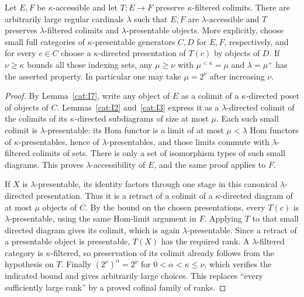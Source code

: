 \begin{theorem}\label{cat:I8}
Let $E,F$ be $\kappa$-accessible and let $T:E\to F$ preserve
$\kappa$-filtered colimits.  There are arbitrarily large regular
cardinals $\lambda$ such that $E,F$ are $\lambda$-accessible and
$T$ preserves $\lambda$-filtered colimits and
$\lambda$-presentable objects.
More explicitly, choose small full categories of $\kappa$-presentable
generators $C,D$ for $E,F$, respectively, and for every $c\in C$
choose a $\kappa$-directed presentation of $T(c)$ by objects of $D$.
If $\nu\geq\kappa$ bounds all those indexing sets, any
$\mu\geq\nu$ with $\mu^{<\kappa}=\mu$ and
$\lambda=\mu^+$ has the asserted property.
In particular one may take $\mu=2^\nu$ after increasing $\nu$.
\end{theorem}
\begin{proof}
By Lemma~\ref{cat:I7}, write any object of $E$ as a colimit of a
$\kappa$-directed poset of objects of $C$.
Lemmas~\ref{cat:I2} and~\ref{cat:I3} express it as a
$\lambda$-directed colimit of the colimits of its
$\kappa$-directed subdiagrams of size at most $\mu$.
Each such small colimit is $\lambda$-presentable: its Hom functor
is a limit of at most $\mu<\lambda$ Hom functors of
$\kappa$-presentables, hence of $\lambda$-presentables, and those
limits commute with $\lambda$-filtered colimits of sets.
There is only a set of isomorphism types of such small diagrams.
This proves $\lambda$-accessibility of $E$, and the same proof
applies to $F$.

If $X$ is $\lambda$-presentable, its identity factors through one
stage in this canonical $\lambda$-directed presentation.  Thus it is
a retract of a colimit of a $\kappa$-directed diagram of at most
$\mu$ objects of $C$.  By the bound on the chosen presentations,
every $T(c)$ is $\lambda$-presentable, using the same Hom-limit
argument in $F$.  Applying $T$ to that small directed diagram gives
its colimit, which is again $\lambda$-presentable.  Since a retract
of a presentable object is presentable, $T(X)$ has the required rank.
A $\lambda$-filtered category is $\kappa$-filtered, so preservation
of its colimit already follows from the hypothesis on $T$.
Finally $(2^\nu)^\alpha=2^\nu$ for $0<\alpha<\kappa\leq\nu$,
which verifies the indicated bound and gives arbitrarily large choices.
This replaces ``every sufficiently large rank'' by a proved cofinal
family of ranks.
\end{proof}

